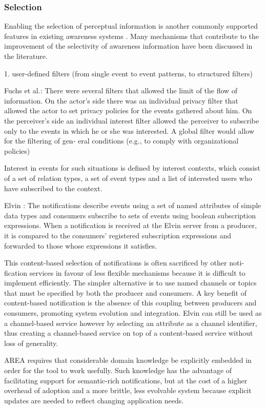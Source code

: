 \subsubsection*{Selection} %
\label{ssub:selection}
Enabling the selection of perceptual information is another commonly supported features in existing awareness systems \cite{David2001}. Many mechanisms that contribute to the improvement of the selectivity of awareness information have been discussed in the literature. 

1. user-defined filters (from single event to event patterns, to structured filters)

Fuchs et al.: There were several filters that allowed the limit of the flow of information. On the actor’s side there was an individual privacy filter that allowed the actor to set privacy policies for the events gathered about him. On the perceiver’s side an individual interest filter allowed the perceiver to subscribe only to the events in which he or she was interested. A global filter would allow for the filtering of gen- eral conditions (e.g., to comply with organizational policies)

Interest in events for such situations is defined by interest contexts, which consist of a set of relation types, a set of event types and a list of interested users who have subscribed to the context.   

Elvin \cite{Fitzpatrick2002}: The notifications describe events using a set of named attributes of simple data types and consumers subscribe to sets of events using boolean subscription expressions. When a notification is received at the Elvin server from a producer, it is compared to the consumers’ registered subscription expressions and forwarded to those whose expressions it satisfies.

This content-based selection of notifications is often sacrificed by other noti-
fication services in favour of less flexible mechanisms because it is difficult to implement efficiently. The simpler alternative is to use named channels or topics that must be specified by both the producer and consumers. A key benefit of content-based notification is the absence of this coupling between producers and consumers, promoting system evolution and integration. Elvin can still be used as a channel-based service however by selecting an attribute as a channel identifier, thus creating a channel-based service on top of a content-based service without loss of generality.

AREA requires that considerable domain knowledge be explicitly embedded in order for the tool to work usefully. Such knowledge has the advantage of facilitating support for semantic-rich notifications, but at the cost of a higher overhead of adoption and a more brittle, less evolvable system because explicit updates are needed to reflect changing application needs.

